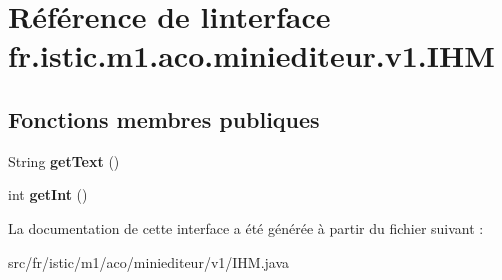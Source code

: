 \hypertarget{interfacefr_1_1istic_1_1m1_1_1aco_1_1miniediteur_1_1v1_1_1IHM}{}\section{Référence de l\textquotesingle{}interface fr.\+istic.\+m1.\+aco.\+miniediteur.\+v1.\+I\+HM}
\label{interfacefr_1_1istic_1_1m1_1_1aco_1_1miniediteur_1_1v1_1_1IHM}
\subsection*{Fonctions membres publiques}
\begin{DoxyCompactItemize}
\item 
\mbox{\label{interfacefr_1_1istic_1_1m1_1_1aco_1_1miniediteur_1_1v1_1_1IHM_a3a2eaf2d7c5d0fa8f2de907c54f3e59b}} 
String {\bfseries get\+Text} ()
\item 
\mbox{\label{interfacefr_1_1istic_1_1m1_1_1aco_1_1miniediteur_1_1v1_1_1IHM_af00142fae9bec9cb8ff9920436d6986f}} 
int {\bfseries get\+Int} ()
\end{DoxyCompactItemize}


La documentation de cette interface a été générée à partir du fichier suivant \+:\begin{DoxyCompactItemize}
\item 
src/fr/istic/m1/aco/miniediteur/v1/I\+H\+M.\+java\end{DoxyCompactItemize}
